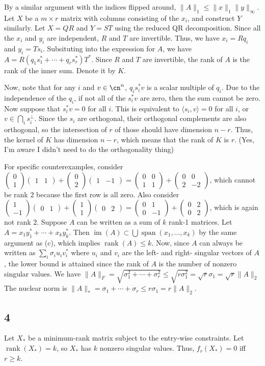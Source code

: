 \documentclass{article}
\newcommand{\openm}{\begin{pmatrix}}
\newcommand{\closem}{\end{pmatrix}}
\DeclareMathOperator{\rank}{rank}
\DeclareMathOperator{\im}{im}
\DeclareMathOperator{\Span}{span}
\begin{document}
By a similar argument with the indices flipped around, $\|A\|_1\leq\|x\|_1\|y\|_\infty$.
Let $X$ be a $m\times r$ matrix with columns consisting of the $x_i$, and construct $Y$ similarly. Let $X=QR$ and $Y=ST$ using the reduced QR decomposition. Since all the $x_i$ and $y_i$ are independent, $R$ and $T$ are invertible. Thus, we have $x_i=Rq_i$ and $y_i=Ts_i$. Subsituting into the expression for $A$, we have $A=R(q_1s_1^*+\cdots+q_rs_r^*)T^*$. Since $R$ and $T$ are invertible, the rank of $A$ is the rank of the inner sum. Denote it by $K$. 

Now, note that for any $i$ and $v\in\cn^n$, $q_is_i^*v$ is a scalar multiple of $q_i$. Due to the independence of the $q_i$, if not all of the $s_i^*v$ are zero, then the sum cannot be zero. Now suppose that $s_i^*v=0$ for all $i$. This is equivalent to $\langle s_i,v\rangle=0$ for all $i$, or $v\in\bigcap_is_i^\perp$. Since the $s_i$ are orthogonal, their orthogonal complements are also orthogonal, so the intersection of $r$ of those should have dimension $n-r$. Thus, the kernel of $K$ has dimension $n-r$, which means that the rank of $K$ is $r$. (Yes, I'm aware I didn't need to do the orthogonality thing)

For specific counterexamples, consider $\openm0\\1\closem\openm1&1\closem+\openm0\\2\closem\openm1&-1\closem=\openm0&0\\1&1\closem+\openm0&0\\2&-2\closem$, which cannot be rank $2$ because the first row is all zero. Also consider $\openm1\\-1\closem\openm0&1\closem+\openm1\\1\closem\openm0&2\closem=\openm0&1\\0&-1\closem+\openm0&2\\0&2\closem$, which is again not rank $2$.
Suppose $A$ can be written as a sum of $k$ rank-1 matrices. Let $A=x_1y_1^*+\cdots+x_ky_k^*$. Then $\im(A)\subset\bigcup\Span(x_1,\ldots,x_k)$ by the same argument as (c), which implies $\rank(A)\leq k$. Now, since $A$ can always be written as $\sum_i\sigma_iu_iv_i^*$ where $u_i$ and $v_i$ are the left- and right- singular vectors of $A$, the lower bound is attained since the rank of $A$ is the number of nonzero singular values.
We have $\|A\|_F=\sqrt{\sigma_1^2+\cdots+\sigma_r^2}\leq\sqrt{r\sigma_1^2}=\sqrt{r}\sigma_1=\sqrt{r}\|A\|_2$
The nuclear norm is $\|A\|_*=\sigma_1+\cdots+\sigma_r\leq r\sigma_1=r\|A\|_2$.
\subsection*{4}
Let $X_*$ be a minimum-rank matrix subject to the entry-wise constraints. Let $\rank(X_*)=k$, so $X_*$ has $k$ nonzero singular values. Thus, $f_r(X_*)=0$ iff $r\geq k$. 
\end{document}
